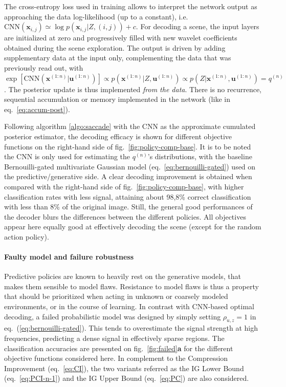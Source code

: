\documentclass[12pt,twoside,openright]{article}
\begin{document}
The cross-entropy loss used in training {\color{Purple} allows to interpret} the network output as {\color{Purple} approaching} the data log-likelihood {\color{Purple}(up to a constant), i.e. $\text{CNN}(\boldsymbol{x}_{i,j}) \simeq \log p(\boldsymbol{x}_{i,j}|Z,(i,j)) + c$}. For decoding a scene, the input layers are initialized at zero  and progressively filled with new wavelet coefficients {\color{Purple} obtained during the scene exploration}.
The output is driven by adding supplementary data at the input only, complementing the data that was previously read out, {\color{Purple} with $\exp \left[\text{CNN}(\boldsymbol{x}^{(1:n)}|\boldsymbol{u}^{(1:n)})\right] \propto p(\boldsymbol{x}^{(1:n)}|Z,\boldsymbol{u}^{(1:n)}) \propto p(Z|\boldsymbol{x}^{(1:n)},\boldsymbol{u}^{(1:n)}) = q^{(n)}$.} The posterior update is thus implemented \emph{from the data}. There is no recurrence, sequential accumulation or memory implemented in the network (like in eq.~\ref{eq:accum-post}). %


Following algorithm \ref{algo:saccade} with the CNN as the {\color{Purple} approximate cumulated posterior estimator}, the decoding efficacy is shown for different objective functions on the right-hand side of  fig.~\ref{fig:policy-comp-base}. {\color{Purple} It is to be noted the CNN is only used for estimating the $q^{(n)}$'s distributions, with the baseline Bernouilli-gated multivariate Gaussian model (eq.~\ref{eq:bernouilli-gated}) used on the predictive/generative side}. A clear decoding improvement is obtained {\color{Purple} when compared with the right-hand side of fig.~\ref{fig:policy-comp-base}}, with higher classification rates with less signal, attaining about 98,8\% correct classification with less than 8\% of the original image. Still, the general good performances of the decoder blurs the differences between the different policies. All objectives appear here equally good at effectively decoding the scene {\color{Purple} (except for the random action policy)}. 

\paragraph{Faulty model and failure robustness}
Predictive policies {\color{Purple}are known to heavily rest} on the generative models, that makes them sensible to model flaws. Resistance to model flaws is thus a property that should be prioritized when acting in unknown or coarsely modeled environments, or in the course of learning. In contrast with CNN-based optimal decoding, a failed probabilistic model was designed by simply setting $\rho_{u,z} = 1$ in eq.~(\ref{eq:bernouilli-gated}).  This tends to overestimate the signal strength at high frequencies, predicting a dense signal in effectively sparse regions. The classification accuracies are presented on fig.~\ref{fig:failed}\textbf{a} for the different objective functions considered here. In complement to the Compression Improvement (eq.~\ref{eq:CI}), the two variants referred as the IG Lower Bound (eq.~\ref{eq:PCI-n-1}) and the IG Upper Bound (eq.~\ref{eq:PC}) are also considered. 
\end{document}

